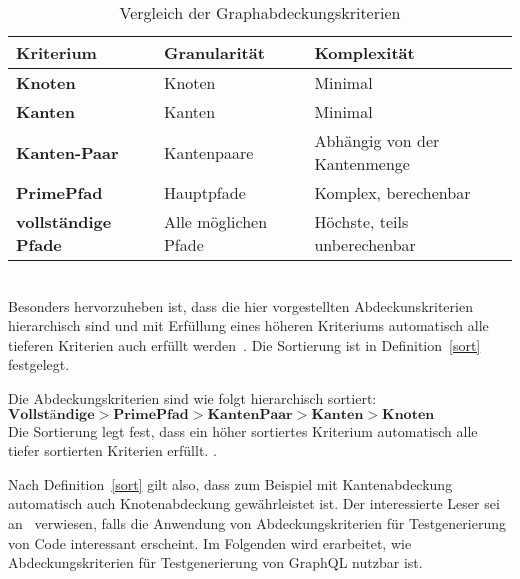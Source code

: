 \begin{center}
    \begin{table}[!ht]
        \begin{tabularx}{\textwidth}{|C|C|C|}
            \hline
            \textbf{Kriterium} & \textbf{Granularität} & \textbf{Komplexität} \\
            \hline
            \textbf{Knoten} & Knoten & Minimal \\
            \hline
            \textbf{Kanten} & Kanten & Minimal \\
            \hline
            \textbf{Kanten-Paar} & Kantenpaare & Abhängig von der Kantenmenge \\
            \hline
            \textbf{PrimePfad} & Hauptpfade & Komplex, berechenbar \\
            \hline
            \textbf{vollständige Pfade} & Alle möglichen Pfade & Höchste, teils unberechenbar \\
            \hline
        \end{tabularx}
        \caption{Vergleich der Graphabdeckungskriterien}
    \end{table}
\end{center}
\\

Besonders hervorzuheben ist, dass die hier vorgestellten Abdeckunskriterien hierarchisch sind und mit Erfüllung eines höheren Kriteriums automatisch alle tieferen Kriterien auch erfüllt werden~\cite[vgl. Figure 2.15]{software-testing}.
Die Sortierung ist in Definition~\ref{sort} festgelegt. \\
\begin{definition}
    Die Abdeckungskriterien sind wie folgt hierarchisch sortiert: \\
    $ \textbf{Vollständige} > \textbf{PrimePfad} > \textbf{KantenPaar} > \textbf{Kanten} > \textbf{Knoten} $ \\
    Die Sortierung legt fest, dass ein höher sortiertes Kriterium automatisch alle tiefer sortierten Kriterien erfüllt.
    \cite[vgl. Figure 2.15]{software-testing}.
    \label{sort}
\end{definition}

Nach Definition~\ref{sort} gilt also, dass zum Beispiel mit Kantenabdeckung automatisch auch Knotenabdeckung gewährleistet ist.
Der interessierte Leser sei an~\cite{software-testing} verwiesen, falls die Anwendung von Abdeckungskriterien für Testgenerierung von Code interessant erscheint.
Im Folgenden wird erarbeitet, wie Abdeckungskriterien für Testgenerierung von GraphQL nutzbar ist.